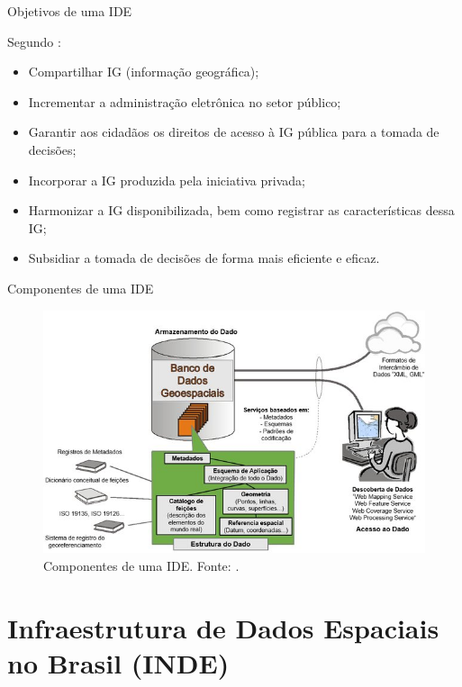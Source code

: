\documentclass[9pt,ignorenonframetext,]{beamer}
\providecommand{\tightlist}{%
  \setlength{\itemsep}{0pt}\setlength{\parskip}{0pt}}
\begin{document}
\begin{frame}{Objetivos de uma IDE}
\protect\hypertarget{objetivos-de-uma-ide}{}

Segundo \textcite{INDE}:

\begin{itemize}[<+->]
\tightlist
\item
  Compartilhar IG (informação geográfica);
\item
  Incrementar a administração eletrônica no setor público;
\item
  Garantir aos cidadãos os direitos de acesso à IG pública para a tomada
  de decisões;
\item
  Incorporar a IG produzida pela iniciativa privada;
\item
  Harmonizar a IG disponibilizada, bem como registrar as características
  dessa IG;
\item
  Subsidiar a tomada de decisões de forma mais eficiente e eficaz.
\end{itemize}

\end{frame}

\begin{frame}{Componentes de uma IDE}
\protect\hypertarget{componentes-de-uma-ide}{}

\begin{figure}[H]

{\centering \includegraphics[width=0.7\linewidth]{Figura-2-Componentes-principais-de-uma-IDE_W640} 

}

\caption{Componentes de uma IDE. Fonte: \textcite{IDEM}.}\label{fig:unnamed-chunk-1}
\end{figure}

\end{frame}

\hypertarget{infraestrutura-de-dados-espaciais-no-brasil-inde}{%
\section{Infraestrutura de Dados Espaciais no Brasil
(INDE)}\label{infraestrutura-de-dados-espaciais-no-brasil-inde}}
\end{document}
